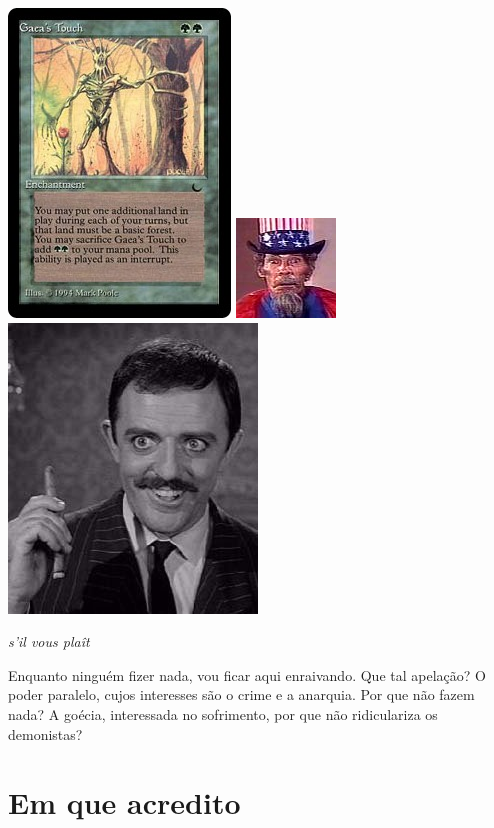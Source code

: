 \documentclass[12pt,a4paper]{article}
\begin{document}
		\begin{center}
		\includegraphics{gaea}
		\includegraphics{tiosam}
		\includegraphics{adams}
		\end{center}

		\emph{s'il vous plaît}\cite{x}%

		Enquanto ningu\'em fizer nada, vou ficar aqui enraivando\cite{x}. Que tal apela\c{c}\~ao? O poder paralelo, cujos interesses s\~ao o crime\cite{x} e a anarquia. Por que n\~ao fazem nada? A go\'ecia, interessada no sofrimento, por que n\~ao ridiculariza os demonistas?

	\section{Em que acredito}
			\begin{flushright}
			\end{flushright}
\end{document}
